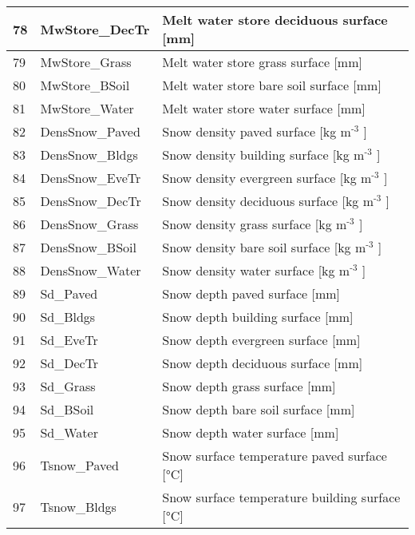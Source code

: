 \documentclass[letterpaper,10pt,english]{sphinxmanual}
\begin{document}
\begin{savenotes}
\begin{longtable}{|l|l|l|}
\hline
78
&
MwStore\_DecTr
&
Melt water store \textendash{} deciduous surface {[}mm{]}
\\
\hline
79
&
MwStore\_Grass
&
Melt water store \textendash{} grass surface {[}mm{]}
\\
\hline
80
&
MwStore\_BSoil
&
Melt water store \textendash{} bare soil surface {[}mm{]}
\\
\hline
81
&
MwStore\_Water
&
Melt water store \textendash{} water surface {[}mm{]}
\\
\hline
82
&
DensSnow\_Paved
&
Snow density \textendash{} paved surface {[}kg m$^{\text{-3}}$ {]}
\\
\hline
83
&
DensSnow\_Bldgs
&
Snow density \textendash{} building surface {[}kg m$^{\text{-3}}$ {]}
\\
\hline
84
&
DensSnow\_EveTr
&
Snow density \textendash{} evergreen surface {[}kg m$^{\text{-3}}$ {]}
\\
\hline
85
&
DensSnow\_DecTr
&
Snow density \textendash{} deciduous surface {[}kg m$^{\text{-3}}$ {]}
\\
\hline
86
&
DensSnow\_Grass
&
Snow density \textendash{} grass surface {[}kg m$^{\text{-3}}$ {]}
\\
\hline
87
&
DensSnow\_BSoil
&
Snow density \textendash{} bare soil surface {[}kg m$^{\text{-3}}$ {]}
\\
\hline
88
&
DensSnow\_Water
&
Snow density \textendash{} water surface {[}kg m$^{\text{-3}}$ {]}
\\
\hline
89
&
Sd\_Paved
&
Snow depth \textendash{} paved surface {[}mm{]}
\\
\hline
90
&
Sd\_Bldgs
&
Snow depth \textendash{} building surface {[}mm{]}
\\
\hline
91
&
Sd\_EveTr
&
Snow depth \textendash{} evergreen surface {[}mm{]}
\\
\hline
92
&
Sd\_DecTr
&
Snow depth \textendash{} deciduous surface {[}mm{]}
\\
\hline
93
&
Sd\_Grass
&
Snow depth \textendash{} grass surface {[}mm{]}
\\
\hline
94
&
Sd\_BSoil
&
Snow depth \textendash{} bare soil surface {[}mm{]}
\\
\hline
95
&
Sd\_Water
&
Snow depth \textendash{} water surface {[}mm{]}
\\
\hline
96
&
Tsnow\_Paved
&
Snow surface temperature \textendash{} paved surface {[}°C{]}
\\
\hline
97
&
Tsnow\_Bldgs
&
Snow surface temperature \textendash{} building surface {[}°C{]}
\\
\hline

\end{longtable}
\end{savenotes}
\end{document}
